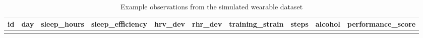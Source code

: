 \documentclass[
  letterpaper,
  DIV=11,
  numbers=noendperiod]{scrreprt}
\begin{document}
\begin{longtable}[]{@{}
  >{\raggedleft\arraybackslash}p{}
  >{\raggedleft\arraybackslash}p{}
  >{\raggedleft\arraybackslash}p{}
  >{\raggedleft\arraybackslash}p{}
  >{\raggedleft\arraybackslash}p{}
  >{\raggedleft\arraybackslash}p{}
  >{\raggedleft\arraybackslash}p{}
  >{\raggedleft\arraybackslash}p{}
  >{\raggedleft\arraybackslash}p{}
  >{\raggedleft\arraybackslash}p{}@{}}
\caption{Example observations from the simulated wearable
dataset}\tabularnewline
\toprule\noalign{}
\begin{minipage}[b]{\linewidth}\raggedleft
id
\end{minipage} & \begin{minipage}[b]{\linewidth}\raggedleft
day
\end{minipage} & \begin{minipage}[b]{\linewidth}\raggedleft
sleep\_hours
\end{minipage} & \begin{minipage}[b]{\linewidth}\raggedleft
sleep\_efficiency
\end{minipage} & \begin{minipage}[b]{\linewidth}\raggedleft
hrv\_dev
\end{minipage} & \begin{minipage}[b]{\linewidth}\raggedleft
rhr\_dev
\end{minipage} & \begin{minipage}[b]{\linewidth}\raggedleft
training\_strain
\end{minipage} & \begin{minipage}[b]{\linewidth}\raggedleft
steps
\end{minipage} & \begin{minipage}[b]{\linewidth}\raggedleft
alcohol
\end{minipage} & \begin{minipage}[b]{\linewidth}\raggedleft
performance\_score
\end{minipage} \\
\midrule\noalign{}
\endfirsthead
\toprule\noalign{}
\begin{minipage}[b]{\linewidth}\raggedleft

\end{minipage}
\end{longtable}
\end{document}
